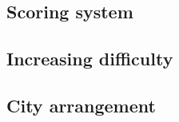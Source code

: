 \documentclass{article}
\begin{document}
\subsection{Scoring system}

\subsection{Increasing difficulty}

\subsection{City arrangement}




\printbibliography
\end{document}

